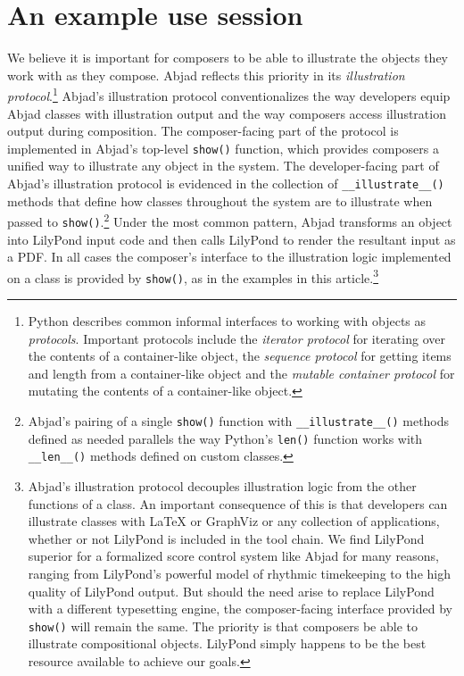 \documentclass{article}
\begin{document}
\section{An example use session} \label{sec:illustration}

We believe it is important for composers to be able to illustrate the objects
they work with as they compose. Abjad reflects this priority in its
\emph{illustration protocol}.\footnote{Python describes common informal
interfaces to working with objects as \emph{protocols}. Important protocols
include the \emph{iterator protocol} for iterating over the contents of a
container-like object, the \emph{sequence protocol} for getting items and
length from a container-like object and the \emph{mutable container protocol}
for mutating the contents of a container-like object.} Abjad's illustration
protocol conventionalizes the way developers equip Abjad classes with
illustration output and the way composers access illustration output during
composition. The composer-facing part of the protocol is implemented in Abjad's
top-level \texttt{show()} function, which provides composers a unified way to
illustrate any object in the system. The developer-facing part of Abjad's
illustration protocol is evidenced in the collection of
\texttt{\_\_illustrate\_\_()} methods that define how classes throughout the
system are to illustrate when passed to \texttt{show()}.\footnote{Abjad's
pairing of a single \texttt{show()} function with \texttt{\_\_illustrate\_\_()}
methods defined as needed parallels the way Python's \texttt{len()} function
works with \texttt{\_\_len\_\_()} methods defined on custom classes.} Under the
most common pattern, Abjad transforms an object into LilyPond input code and
then calls LilyPond to render the resultant input as a PDF. In all cases the
composer's interface to the illustration logic implemented on a  class is
provided by \texttt{show()}, as in the examples in this
article.\footnote{Abjad's illustration protocol decouples illustration logic
from the other functions of a class. An important consequence of this is that
developers can illustrate classes with LaTeX or GraphViz or any collection of
applications, whether or not LilyPond is included in the tool chain. We find
LilyPond superior for a formalized score control system like Abjad for many
reasons, ranging from LilyPond's powerful model of rhythmic timekeeping to the
high quality of LilyPond output. But should the need arise to replace LilyPond
with a different typesetting engine, the composer-facing  interface provided by
\texttt{show()} will remain the same. The priority is that composers be able to
illustrate compositional objects. LilyPond simply happens to be the best
resource available to achieve our goals.}
\end{document}
